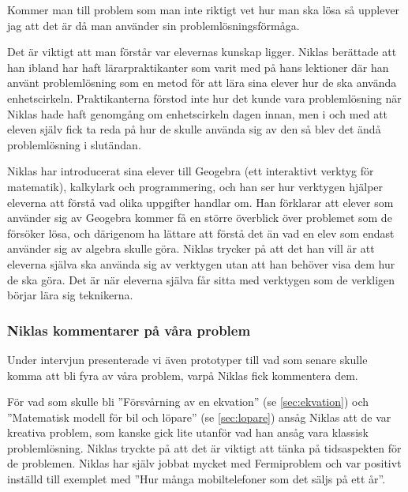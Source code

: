 \begin{displayquote}
\textcolor{turkos}{
Kommer man till problem som man inte riktigt vet hur man ska lösa så upplever jag att det är då man använder sin problemlösningsförmåga.
}
\end{displayquote}

\textcolor{turkos}{
Det är viktigt att man förstår var elevernas kunskap ligger. Niklas berättade att han ibland har haft lärarpraktikanter som varit med på hans lektioner där han använt problemlösning som en metod för att lära sina elever hur de ska använda enhetscirkeln. Praktikanterna förstod inte hur det kunde vara problemlösning när Niklas hade haft genomgång om enhetscirkeln dagen innan, men i och med att eleven själv fick ta reda på hur de skulle använda sig av den så blev det ändå problemlösning i slutändan. 
}

\textcolor{turkos}{
Niklas har introducerat sina elever till Geogebra (ett interaktivt verktyg för matematik), kalkylark och programmering, och han ser hur verktygen hjälper eleverna att förstå vad olika uppgifter handlar om. Han förklarar att elever som använder sig av Geogebra kommer få en större överblick över problemet som de försöker lösa, och därigenom ha lättare att förstå det än vad en elev som endast använder sig av algebra skulle göra. Niklas trycker på att det han vill är att eleverna själva ska använda sig av verktygen utan att han behöver visa dem hur de ska göra. Det är när eleverna själva får sitta med verktygen som de verkligen börjar lära sig teknikerna.
}




\subsubsection{Niklas kommentarer på våra problem}
\label{sec:NiklasKommentarer}
\textcolor{turkos}{Under intervjun presenterade vi även prototyper till vad som senare skulle komma att bli fyra av våra problem, varpå Niklas fick kommentera dem.}

\textcolor{turkos}{För vad som skulle bli ''Försvårning av en ekvation'' (se \ref{sec:ekvation}) och ''Matematisk modell för bil och löpare'' (se \ref{sec:lopare})  ansåg Niklas att de var kreativa problem, som kanske gick lite utanför vad han ansåg vara klassisk problemlösning. Niklas tryckte på att det är viktigt att tänka på tidsaspekten för de problemen. Niklas har själv jobbat mycket med Fermiproblem och var positivt inställd till exemplet med ''Hur många mobiltelefoner som det säljs på ett år''.}

